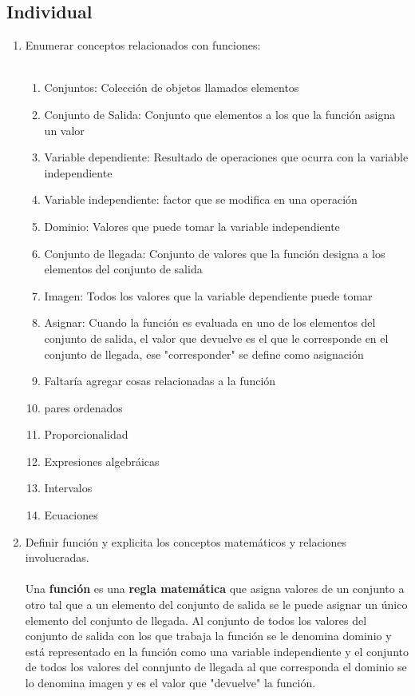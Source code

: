 \documentclass[a4paper]{article}
\begin{document}
\subsection{Individual}
\begin{enumerate}
    \item Enumerar conceptos relacionados con funciones:\\\\
    \begin{enumerate}
        \item Conjuntos: Colección de objetos llamados elementos
        \item Conjunto de Salida: Conjunto que elementos a los que la función asigna un valor
        \item Variable dependiente: Resultado de operaciones que ocurra con la variable independiente
        \item Variable independiente: factor que se modifica en una operación
        \item Dominio: Valores que puede tomar la variable independiente
        \item Conjunto de llegada: Conjunto de valores que la función designa a los elementos del conjunto de salida
        \item Imagen: Todos los valores que la variable dependiente puede tomar
        \item Asignar: Cuando la función es evaluada en uno de los elementos del conjunto de salida, el valor que devuelve es el que le corresponde en el conjunto de llegada, ese "corresponder" se define como asignación 
        \item Faltaría agregar cosas relacionadas a la función
        \item pares ordenados
        \item Proporcionalidad
        \item Expresiones algebráicas
        \item Intervalos
        \item Ecuaciones
    \end{enumerate}
    \item Definir función y explicita los conceptos matemáticos y relaciones involucradas.\\\\
    Una \textbf{función} es una \textbf{regla matemática} que asigna valores de un conjunto a otro tal que a un elemento del conjunto de salida se le puede asignar un único elemento del conjunto de llegada. Al conjunto de todos los valores del conjunto de salida con los que trabaja la función se le denomina dominio y está representado en la función como una variable independiente y el conjunto de todos los valores del connjunto de llegada al que corresponda el dominio se lo denomina imagen y es el valor que "devuelve" la función. 
\end{enumerate}
\end{document}
